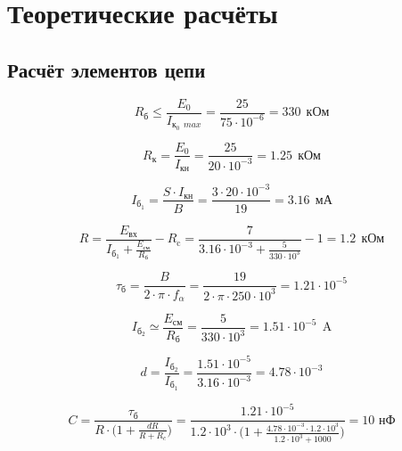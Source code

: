 \section{Теоретические расчёты}

\subsection{Расчёт элементов цепи}

\begin{displaymath}
R_\text{б} \leq \frac{E_0}{I_{\text{к}_0\ \ max}} = \frac{25}{75 \cdot 10^{-6}} = 330\ \ \text{кОм}
\end{displaymath}

\begin{displaymath}
R_\text{к} = \frac{E_0}{I_\text{кн}} = \frac{25}{20 \cdot 10^{-3}} = 1.25\ \ \text{кОм}
\end{displaymath}

\begin{displaymath}
I_{\text{б}_1} = \frac{S \cdot I_\text{кн}}{B} = \frac{3 \cdot 20 \cdot 10^{-3}}{19} = 3.16\ \ \text{мА}
\end{displaymath}

\begin{displaymath}
R = \frac{E_\text{вх}}{I_{\text{б}_1} + \frac{E_\text{см}}{R_\text{б}}} - R_\text{c} = \frac{7}{3.16 \cdot 10^{-3} + \frac{5}{330 \cdot 10^3}} - 1 = 1.2\ \ \text{кОм}
\end{displaymath}

\begin{displaymath}
\tau_{\text{б}} = \frac{B}{2 \cdot \pi \cdot f_\alpha} = \frac{19}{2 \cdot \pi \cdot 250 \cdot 10^3} = 1.21 \cdot 10^{-5}
\end{displaymath}

\begin{displaymath}
I_{\text{б}_2} \simeq \frac{E_\text{см}}{R_\text{б}} = \frac{5}{330 \cdot 10^3} = 1.51 \cdot 10^{-5}\ \ \text{A}
\end{displaymath}

\begin{displaymath}
d = \frac{I_{\text{б}_2}}{I_{\text{б}_1}} = \frac{ 1.51 \cdot 10^{-5}}{3.16 \cdot 10^{-3}} = 4.78 \cdot 10^{-3}
\end{displaymath}

\begin{displaymath}
C = \frac{\tau_{\text{б}}}{R \cdot \Big ( 1 + \frac{dR}{R+R_c} \Big )} = \frac{1.21 \cdot 10^{-5}}{1.2 \cdot 10^3 \cdot \Big ( 1 + \frac{4.78 \cdot 10^{-3} \cdot 1.2 \cdot 10^3}{1.2 \cdot 10^3+1000} \Big )} = 10 \text{ нФ}
\end{displaymath}

